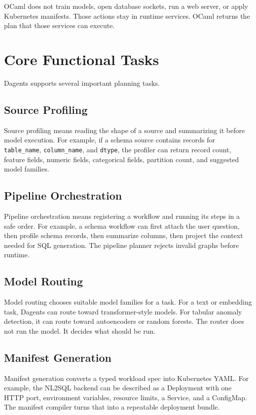 \documentclass[conference]{IEEEtran}
\begin{document}
OCaml does not train models, open database sockets, run a web server, or apply
Kubernetes manifests. Those actions stay in runtime services. OCaml returns the
plan that those services can execute.

\section{Core Functional Tasks}

Dagents supports several important planning tasks.

\subsection{Source Profiling}

Source profiling means reading the shape of a source and summarizing it before
model execution. For example, if a schema source contains records for
\texttt{table\_name}, \texttt{column\_name}, and \texttt{dtype}, the profiler
can return record count, feature fields, numeric fields, categorical fields,
partition count, and suggested model families.

\subsection{Pipeline Orchestration}

Pipeline orchestration means registering a workflow and running its steps in a
safe order. For example, a schema workflow can first attach the user question,
then profile schema records, then summarize columns, then project the context
needed for SQL generation. The pipeline planner rejects invalid graphs before
runtime.

\subsection{Model Routing}

Model routing chooses suitable model families for a task. For a text or
embedding task, Dagents can route toward transformer-style models. For tabular
anomaly detection, it can route toward autoencoders or random forests. The
router does not run the model. It decides what should be run.

\subsection{Manifest Generation}

Manifest generation converts a typed workload spec into Kubernetes YAML. For
example, the NL2SQL backend can be described as a Deployment with one HTTP
port, environment variables, resource limits, a Service, and a ConfigMap. The
manifest compiler turns that into a repeatable deployment bundle.
\end{document}
